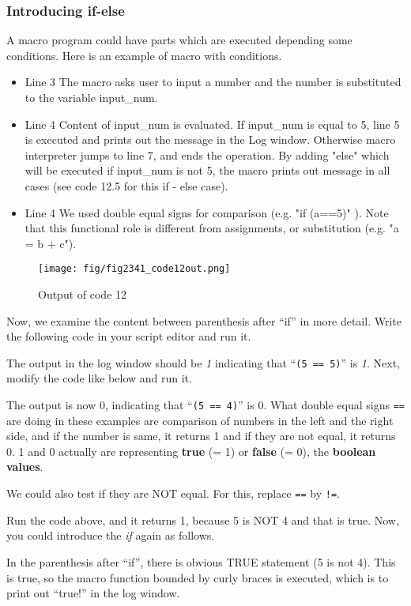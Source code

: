 \documentclass[11pt,a4paper,oneside]{report}
\newcommand{\ilcom}[1]{\texttt{\small#1}}
\begin{document}
\subsubsection{Introducing if-else}
A macro program could have parts which are executed depending some
conditions.
Here is an example of macro with conditions.

\begin{itemize}
\item Line 3 The macro asks user to input a number and the number is substituted to the variable input\_num.
\item Line 4 Content of input\_num is evaluated. If input\_num is equal to 5, line 5 is executed and prints out the message in the Log window. Otherwise macro interpreter jumps to line 7, and ends the operation.  By adding "else" which will be executed if input\_num is not 5, the macro prints out message in all cases (see code 12.5 for this if - else case). 
\item Line 4 We used double equal signs for comparison (e.g. "if (a==5)"
). Note that this functional role is different from assignments, or substitution (e.g. "a = b + c").
\end{itemize}
\begin{figure}[htbp]
\begin{center}
\texttt{[image: fig/fig2341\_code12out.png]}
\caption{Output of code 12}
\label{fig:code12 output}
\end{center}
\end{figure} 

Now, we examine the content between 
parenthesis after ``if'' in more detail. 
Write the following code in your script editor and run it.

The output in the log window should be \textit{1} indicating that ``\ilcom{(5 ==
5)}'' is \textit{1}. Next, modify the code like below and run it.

The output is now 0, indicating that ``\ilcom{(5 == 4)}'' is
0.
What double equal signs \ilcom{==} are doing in these
examples are comparison of numbers in the left and the right side, and if
the number is same, it returns 1 and if they are not equal, it returns 0. 1 and
0 actually are representing \textbf{true} (= 1) or \textbf{false} (= 0), the
\textbf{boolean values}.

We could also test if they are NOT equal. For this, replace \ilcom{==} by
\ilcom{!=}.

Run the code above, and it returns 1, because 5 is NOT 4 and that is true. Now,
you could introduce the \textit{if} again as follows.

In the parenthesis after ``if'', there is obvious TRUE statement (5 is not 4).
This is true, so the macro function bounded by curly braces is executed, which is to
print out ``true!'' in the log window.
\end{document}
